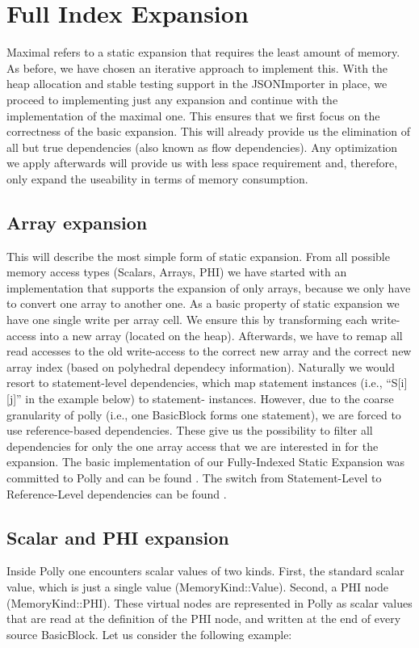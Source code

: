 \chapter{Full Index Expansion}\label{ch:FIE}
Maximal refers to a static expansion that requires the least amount of memory. As before, we have chosen an iterative approach to implement this. With the heap allocation and stable testing support in the JSONImporter in place, we proceed to implementing just any expansion and continue with the implementation of the maximal one. This ensures that we first focus on the correctness of the basic expansion. This will already provide us the elimination of all but true dependencies (also known as flow dependencies). Any optimization we apply afterwards will provide us with less space requirement and, therefore, only expand the useability in terms of memory consumption.

\section{Array expansion}
This will describe the most simple form of static expansion. From all possible memory access types (Scalars, Arrays, PHI) we have started with an implementation that supports the expansion of only arrays, because we only have to convert one array to another one. As a basic property of static expansion we have one single write per array cell. We ensure this by transforming each write-access into a new array (located on the heap). Afterwards, we have to remap all read accesses to the old write-access to the correct new array and the correct new array index (based on polyhedral dependecy information). Naturally we would resort to statement-level dependencies, which map statement instances (i.e., “S[i][j]” in the example below) to statement- instances. However, due to the coarse granularity of polly (i.e., one BasicBlock forms one statement), we are forced to use reference-based dependencies. These give us the possibility to filter all dependencies for only the one array access that we are interested in for the expansion. The basic implementation of our Fully-Indexed Static Expansion was committed to Polly and can be found . The switch from Statement-Level to Reference-Level dependencies can be found .

\section{Scalar and PHI expansion}
Inside Polly one encounters scalar values of two kinds. First, the standard scalar value, which is just a single value (MemoryKind::Value). Second, a PHI node (MemoryKind::PHI). These virtual nodes are represented in Polly as scalar values that are read at the definition of the PHI node, and written at the end of every source BasicBlock. Let us consider the following example:

